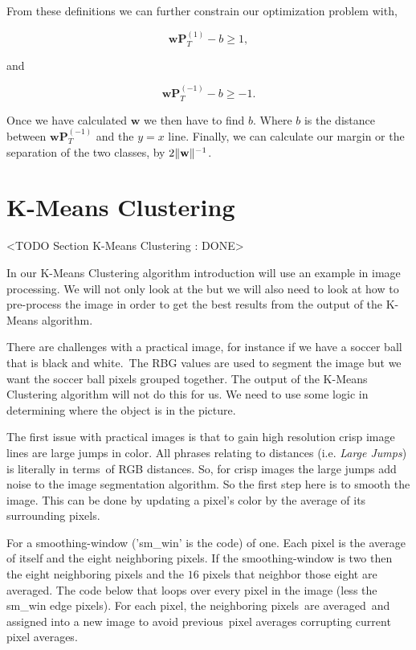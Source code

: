 From these definitions we can further constrain our optimization problem with,

\begin{equation}
\mathbf{w}\mathbf{P}^{(1)}_T - b \geq 1,
\end{equation}

and

\begin{equation}
\mathbf{w}\mathbf{P}^{(-1)}_T - b \geq -1.
\end{equation}

Once we have calculated $\mathbf{w}$ we then have to find $b$. Where $b$ is the distance between $\mathbf{w}\mathbf{P}^{(-1)}_T$ and the $y=x$ line. Finally, we can calculate our margin or the separation of the two classes, by $2\| \mathbf{w} \|^{-1}$.

\section{K-Means Clustering}
	<TODO Section K-Means Clustering : DONE>

In our K-Means Clustering algorithm introduction will use an example in image processing. We will not only look at the  but we will also need to look at how to pre-process the image in order to get the best results from the output of the K-Means algorithm. 

There are challenges with a practical image, for instance if we have a soccer ball that is black and white. The \ac{RBG} values are used to segment the image but we want the soccer ball pixels grouped together. The output of the K-Means Clustering algorithm will not do this for us. We need to use some logic in determining where the object is in the picture.

The first issue with practical images is that to gain high resolution crisp image lines are large jumps in color. All phrases relating to distances (i.e. \emph{Large Jumps}) is literally in terms of \ac{RGB} distances. So, for crisp images the large jumps add noise to the image segmentation algorithm. So the first step here is to smooth the image. This can be done by updating a pixel's color by the average of its surrounding pixels.

For a smoothing-window ('sm\_win' is the code) of one. Each pixel is the average of itself and the eight neighboring pixels. If the smoothing-window is two then the eight neighboring pixels and the $16$ pixels that neighbor those eight are averaged. The code below that loops over every pixel in the image (less the sm\_win edge pixels). For each pixel, the neighboring pixels are averaged and assigned into a new image to avoid previous pixel averages corrupting current pixel averages.

